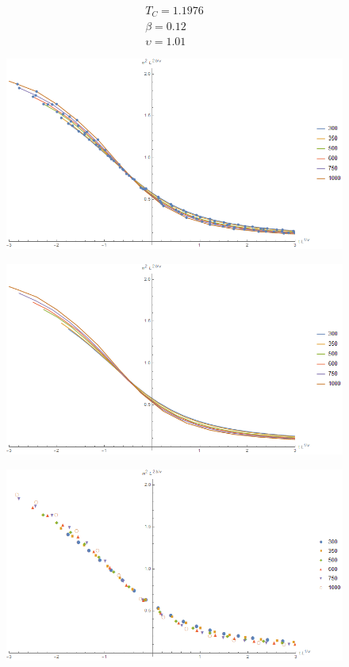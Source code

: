 \begin{align*}
    T_{C} = 1.1976 \\
    \beta = 0.12 \\
    \upsilon = 1.01
\end{align*}

\begin{figure}[!h]
    \centering
    \includegraphics[width=150mm]{Sections/Images/DatColMagn2_1.png}
    \label{fig:DatColM2_1}
\end{figure}

\begin{figure}[!h]
    \centering
    \includegraphics[width=150mm]{Sections/Images/DatColMagn2_2.png}
    \label{fig:DatColM2_2}
\end{figure}

\begin{figure}[!h]
    \centering
    \includegraphics[width=150mm]{Sections/Images/DatColMagn2_3.png}
    \label{fig:DatColM2_3}
\end{figure}

